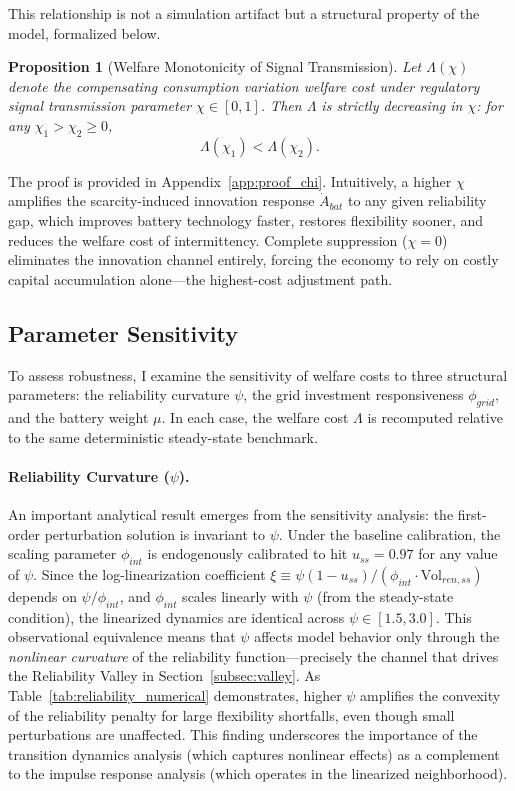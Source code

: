 \documentclass[12pt, a4paper]{article}
\newtheorem{proposition}{Proposition}
\begin{document}
This relationship is not a simulation artifact but a structural property of the model, formalized below.

\begin{proposition}[Welfare Monotonicity of Signal Transmission] \label{prop:chi_monotonicity}
Let $\Lambda(\chi)$ denote the compensating consumption variation welfare cost under regulatory signal transmission parameter $\chi \in [0,1]$. Then $\Lambda$ is strictly decreasing in $\chi$: for any $\chi_1 > \chi_2 \geq 0$,
\[
\Lambda(\chi_1) < \Lambda(\chi_2).
\]
\end{proposition}

\noindent The proof is provided in Appendix~\ref{app:proof_chi}. Intuitively, a higher $\chi$ amplifies the scarcity-induced innovation response $\dot{A}_{bat}$ to any given reliability gap, which improves battery technology faster, restores flexibility sooner, and reduces the welfare cost of intermittency. Complete suppression ($\chi = 0$) eliminates the innovation channel entirely, forcing the economy to rely on costly capital accumulation alone---the highest-cost adjustment path.

\subsection{Parameter Sensitivity}

To assess robustness, I examine the sensitivity of welfare costs to three structural parameters: the reliability curvature $\psi$, the grid investment responsiveness $\phi_{grid}$, and the battery weight $\mu$. In each case, the welfare cost $\Lambda$ is recomputed relative to the same deterministic steady-state benchmark.

\paragraph{Reliability Curvature ($\psi$).} An important analytical result emerges from the sensitivity analysis: the first-order perturbation solution is invariant to $\psi$. Under the baseline calibration, the scaling parameter $\phi_{int}$ is endogenously calibrated to hit $u_{ss} = 0.97$ for any value of $\psi$. Since the log-linearization coefficient $\xi \equiv \psi(1-u_{ss})/(\phi_{int} \cdot \text{Vol}_{ren,ss})$ depends on $\psi / \phi_{int}$, and $\phi_{int}$ scales linearly with $\psi$ (from the steady-state condition), the linearized dynamics are identical across $\psi \in [1.5, 3.0]$. This observational equivalence means that $\psi$ affects model behavior only through the \textit{nonlinear curvature} of the reliability function---precisely the channel that drives the Reliability Valley in Section~\ref{subsec:valley}. As Table~\ref{tab:reliability_numerical} demonstrates, higher $\psi$ amplifies the convexity of the reliability penalty for large flexibility shortfalls, even though small perturbations are unaffected. This finding underscores the importance of the transition dynamics analysis (which captures nonlinear effects) as a complement to the impulse response analysis (which operates in the linearized neighborhood).
\end{document}
